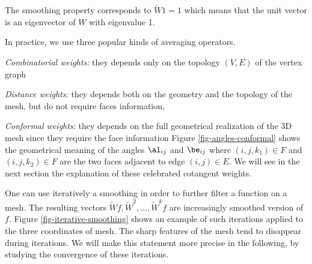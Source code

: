 The smoothing property corresponds to $\tilde W 1 = 1$ which means that the unit vector is an eigenvector of $W$ with eigenvalue 1. 


\begin{exmp} In practice, we use three popular kinds of averaging operators. 
\begin{rs}
	\item \textit{Combinatorial weights:} they depends only on the topology $(V,E)$ of the vertex graph
	\item \textit{Distance weights:} they depends both on the geometry and the topology of the mesh, but do not require faces information,
	\item \textit{Conformal weights:} they depends on the full geometrical realization of the 3D mesh since they require the face information
		Figure \ref{fig-angles-conformal} shows the geometrical meaning of the angles $\al_{ij}$ and $\be_{ij}$
		where $(i,j,k_1) \in F$ and $(i,j,k_2) \in F$ are the two faces adjacent to edge $(i,j) \in E$.
		We will see in the next section the explanation of these celebrated cotangent weights.
\end{rs} 
\end{exmp}


One can use iteratively a smoothing in order to further filter a function on a mesh.
The resulting vectors $\tilde W f, \tilde W^2,\ldots, \tilde W^k f$ are increasingly smoothed version of $f$. Figure \ref{fig-iterative-smoothing} shows an example of such iterations applied to the three coordinates of mesh. The sharp features of the mesh tend to disappear during iterations. We will make this statement more precise in the following, by studying the convergence of these iterations.



